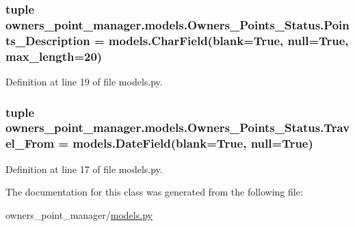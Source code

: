 \hypertarget{classowners__point__manager_1_1models_1_1Owners__Points__Status_adba6f512bb65caa1c93d611e3fc99f3b}{
\subsubsection[{Points\-\_\-\-Description}]{\setlength{\rightskip}{0pt plus 5cm}tuple owners\-\_\-point\-\_\-manager.\-models.\-Owners\-\_\-\-Points\-\_\-\-Status.\-Points\-\_\-\-Description = models.\-Char\-Field(blank=True, null=True, max\-\_\-length=20)\hspace{0.3cm}{\ttfamily [static]}}}\label{classowners__point__manager_1_1models_1_1Owners__Points__Status_adba6f512bb65caa1c93d611e3fc99f3b}


Definition at line 19 of file models.\-py.

\hypertarget{classowners__point__manager_1_1models_1_1Owners__Points__Status_a7b4e92424e34aa30a96e50756d6211ab}{
\subsubsection[{Travel\-\_\-\-From}]{\setlength{\rightskip}{0pt plus 5cm}tuple owners\-\_\-point\-\_\-manager.\-models.\-Owners\-\_\-\-Points\-\_\-\-Status.\-Travel\-\_\-\-From = models.\-Date\-Field(blank=True, null=True)\hspace{0.3cm}{\ttfamily [static]}}}\label{classowners__point__manager_1_1models_1_1Owners__Points__Status_a7b4e92424e34aa30a96e50756d6211ab}


Definition at line 17 of file models.\-py.



The documentation for this class was generated from the following file\-:\begin{DoxyCompactItemize}
\item 
owners\-\_\-point\-\_\-manager/\hyperlink{owners__point__manager_2models_8py}{models.\-py}\end{DoxyCompactItemize}
